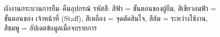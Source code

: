 \begin{figure}[p]
  \centering
  \resizebox{!}{0.86\textheight}{%
  }
  \caption{ผังงานกระบวนการยืม–คืนอุปกรณ์
    รหัสสี: สีฟ้า = ขั้นตอนของผู้ยืม, สีเขียวอมฟ้า = ขั้นตอนของ
    เจ้าหน้าที่ (Staff), สีเหลือง = จุดตัดสินใจ, สีส้ม = ระหว่างใช้งาน, สีชมพู = อัปเดตข้อมูลเมื่อจบรายการ}
  \label{fig:borrowflow}
\end{figure}
